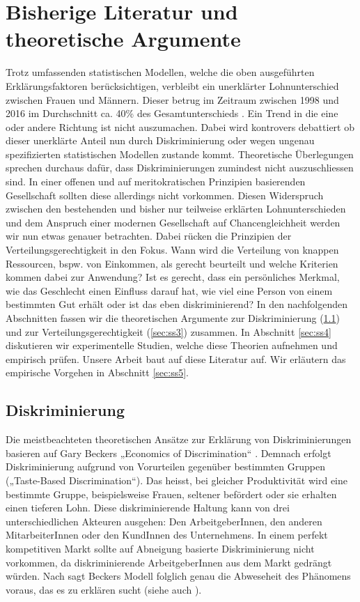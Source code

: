 \documentclass[a4paper,12pt]{article}
\renewcommand{\baselinestretch}{1.1}
\newif\ifcomments
\newcommand{\comment}[1]{%
    \ifcomments\marginpar{\renewcommand{\baselinestretch}{1}\tiny\hspace*{-1.1em}\colorbox{gray!20}%
    {\textcolor{red}{\parbox[t]{.9in}{\raggedright #1}}}}\fi}
\begin{document}
\section{Bisherige Literatur und theoretische Argumente}
\label{sec:s2}
\comment{Abschnitt zu Segregation \& Devaluation in diesem Kapitel (siehe comment oben)?}
Trotz umfassenden statistischen Modellen, welche die oben ausgeführten Erklärungsfaktoren berücksichtigen, verbleibt ein unerklärter Lohnunterschied zwischen Frauen und Männern. Dieser betrug im Zeitraum zwischen 1998 und 2016 im Durchschnitt ca. 40\% des Gesamtunterschieds \citep{BFS-2019a,Strub-2010}. Ein Trend in die eine oder andere Richtung ist nicht auszumachen. Dabei wird kontrovers debattiert ob dieser unerklärte Anteil nun durch Diskriminierung oder wegen ungenau spezifizierten statistischen Modellen zustande kommt. Theoretische Überlegungen sprechen durchaus dafür, dass Diskriminierungen zumindest nicht auszuschliessen sind. In einer offenen und auf meritokratischen Prinzipien basierenden Gesellschaft sollten diese allerdings nicht vorkommen. Diesen Widerspruch zwischen den
bestehenden und bisher nur teilweise erklärten Lohnunterschieden und dem
Anspruch einer modernen Gesellschaft auf Chancengleichheit werden wir nun etwas
genauer betrachten. Dabei rücken die Prinzipien der Verteilungsgerechtigkeit in
den Fokus. 
Wann wird die Verteilung von knappen Ressourcen, bspw. von
Einkommen, als gerecht beurteilt und welche Kriterien kommen dabei zur
Anwendung? Ist es gerecht, dass ein persönliches Merkmal, wie das Geschlecht
einen Einfluss darauf hat, wie viel eine Person von einem bestimmten Gut
erhält oder ist das eben diskriminierend? In den nachfolgenden Abschnitten fassen wir die theoretischen Argumente zur Diskriminierung (\ref{sec:ss2}) und zur Verteilungsgerechtigkeit (\ref{sec:ss3}) zusammen. In Abschnitt \ref{sec:ss4} diskutieren wir experimentelle Studien, welche diese Theorien aufnehmen und empirisch prüfen. Unsere Arbeit baut auf diese Literatur auf. Wir erläutern das empirische Vorgehen in Abschnitt \ref{sec:ss5}.


\subsection{Diskriminierung}
\label{sec:ss2}
\comment{Abschnitt wurde neu überarbeitet}

Die meistbeachteten theoretischen Ansätze zur Erklärung von Diskriminierungen basieren auf Gary
Beckers „Economics of Discrimination“ \citep{Becker-1973}. Demnach erfolgt Diskriminierung aufgrund von Vorurteilen gegenüber bestimmten Gruppen („Taste-Based Discrimination“). Das heisst, bei gleicher Produktivität wird eine bestimmte Gruppe, beispielsweise Frauen, seltener befördert oder sie erhalten einen tieferen Lohn. Diese diskriminierende Haltung kann von drei unterschiedlichen Akteuren ausgehen: Den ArbeitgeberInnen, den anderen MitarbeiterInnen oder den KundInnen des Unternehmens. In einem perfekt kompetitiven Markt sollte auf Abneigung basierte Diskriminierung nicht vorkommen, da diskriminierende ArbeitgeberInnen aus dem Markt gedrängt würden. Nach \cite{Arrow-1972} sagt Beckers Modell folglich genau die Abweseheit des Phänomens voraus, das es zu erklären sucht (siehe auch  \citealp{Guryan-2013}).
\end{document}
